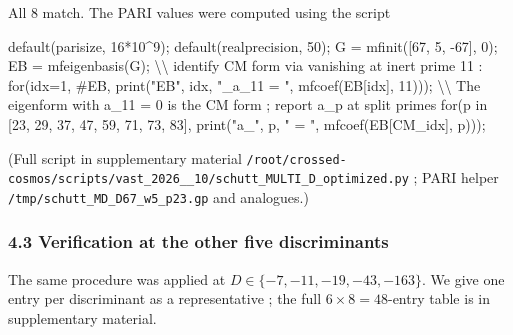 \documentclass[
  11pt,
  a4paper,
]{amsart}
\newenvironment{Shaded}{}{}
\newcommand{\NormalTok}[1]{#1}
\begin{document}
All 8 match. The PARI values were computed using the script

\begin{Shaded}
\begin{Highlighting}[]
\NormalTok{default(parisize, 16*10\^{}9);}
\NormalTok{default(realprecision, 50);}
\NormalTok{G = mfinit([67, 5, {-}67], 0);}
\NormalTok{EB = mfeigenbasis(G);}
\NormalTok{\textbackslash{}\textbackslash{} identify CM form via vanishing at inert prime 11 :}
\NormalTok{for(idx=1, \#EB, print("EB", idx, "\_a\_11 = ", mfcoef(EB[idx], 11)));}
\NormalTok{\textbackslash{}\textbackslash{} The eigenform with a\_11 = 0 is the CM form ; report a\_p at split primes}
\NormalTok{for(p in [23, 29, 37, 47, 59, 71, 73, 83],}
\NormalTok{    print("a\_", p, " = ", mfcoef(EB[CM\_idx], p)));}
\end{Highlighting}
\end{Shaded}

(Full script in supplementary material \texttt{/root/crossed-cosmos/\allowbreak scripts/vast\_2026\_\_10/\allowbreak schutt\_MULTI\_D\_\allowbreak optimized.py} ; PARI helper \texttt{/tmp/schutt\_MD\_D67\_w5\_p23.gp} and analogues.)

\hypertarget{verification-at-the-other-five-discriminants}{%
\subsubsection{4.3 Verification at the other five discriminants}\label{verification-at-the-other-five-discriminants}}

The same procedure was applied at \(D \in \{-7, -11, -19, -43, -163\}\). We give one entry per discriminant as a representative ; the full \(6 \times 8 = 48\)-entry table is in supplementary material.
\end{document}
